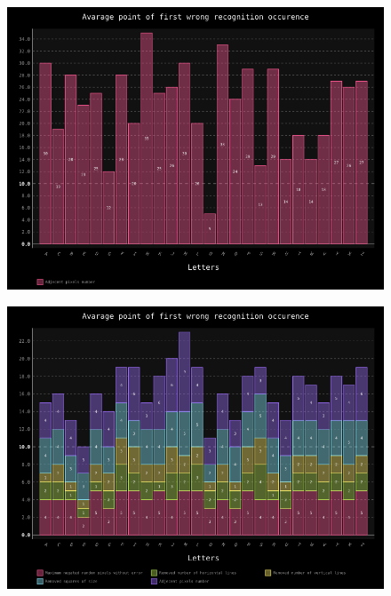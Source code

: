 \documentclass[a4paper]{article}
\begin{document}
\begin{figure}[h!]
	\centering
	\includegraphics[scale=0.7,keepaspectratio=true]{Charts/AdjecentTestPlanResultsChart_ClasifierTester.png}	
	\caption{}
	\label{adjecent_clas}
\end{figure}

\begin{figure}[h!]
	\centering
	\includegraphics[scale=0.7,keepaspectratio=true]{Charts/AllTestPlanResultsChart_NormalTester.png}	
	\caption{}
	\label{all_trans}
\end{figure}
\end{document}
